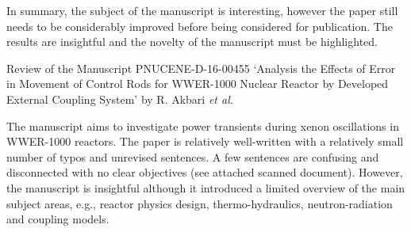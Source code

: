 \documentclass[14pt,twoside]{report}
\begin{document}
In summary, the subject of the manuscript is interesting, however the paper still needs to be considerably improved before being considered for publication. The results are insightful and the novelty of the manuscript must be highlighted. 

\medskip
{
  } 


\clearpage


\begin{center}
  {\Large Review of the Manuscript PNUCENE-D-16-00455 `Analysis the Effects of Error in Movement of Control Rods for WWER-1000 Nuclear Reactor by Developed External Coupling System' by R. Akbari {\it et al.}}
\end{center}

\medskip

The manuscript aims to investigate power transients during xenon oscillations in WWER-1000 reactors. The paper is relatively well-written with a relatively small number of typos and unrevised sentences. A few sentences are confusing and disconnected with no clear objectives (see attached scanned document).  However, the manuscript is insightful although it introduced a limited overview of the main subject areas, e.g., reactor physics design, thermo-hydraulics, neutron-radiation and coupling models.
\end{document}
